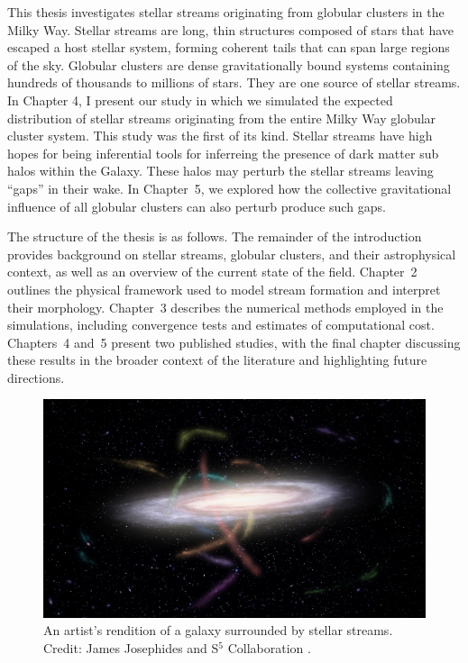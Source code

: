 This thesis investigates stellar streams originating from globular clusters in the Milky Way. Stellar streams are long, thin structures composed of stars that have escaped a host stellar system, forming coherent tails that can span large regions of the sky. Globular clusters are dense gravitationally bound systems containing hundreds of thousands to millions of stars. They are one source of stellar streams. In Chapter 4, I present our study in which we simulated the expected distribution of stellar streams originating from the entire Milky Way globular cluster system. This study was the first of its kind. Stellar streams have high hopes for being inferential tools for inferreing the presence of dark matter sub halos within the Galaxy. These halos may perturb the stellar streams leaving ``gaps'' in their wake. In Chapter~5, we explored how the collective gravitational influence of all globular clusters can also perturb produce such gaps.

The structure of the thesis is as follows. The remainder of the introduction provides background on stellar streams, globular clusters, and their astrophysical context, as well as an overview of the current state of the field. Chapter~2 outlines the physical framework used to model stream formation and interpret their morphology. Chapter~3 describes the numerical methods employed in the simulations, including convergence tests and estimates of computational cost. Chapters~4 and~5 present two published studies, with the final chapter discussing these results in the broader context of the literature and highlighting future directions.
\begin{figure}
    \centering
    \includegraphics[width=\linewidth]{images/S5MilkywayStreams.jpg}
    \caption{An artist's rendition of a galaxy surrounded by stellar streams. Credit: James Josephides and S$^5$ Collaboration \citep{2019MNRAS.490.3508L}.}
    \label{fig:S5MilkywayStreams}
\end{figure}

